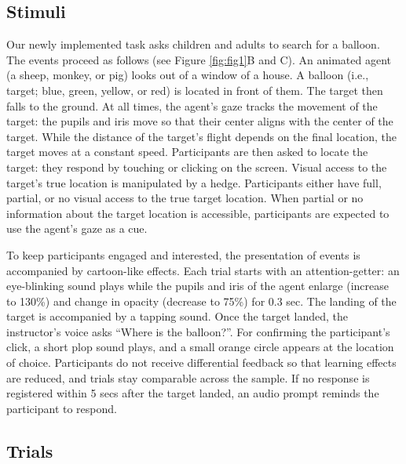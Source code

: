 \documentclass[
  man,floatsintext]{apa6}
\begin{document}
\hypertarget{stimuli}{%
\subsection{Stimuli}\label{stimuli}}

Our newly implemented task asks children and adults to search for a balloon.
The events proceed as follows (see Figure \ref{fig:fig1}B and C).
An animated agent (a sheep, monkey, or pig) looks out of a window of a house.
A balloon (i.e., target; blue, green, yellow, or red) is located in front of them.
The target then falls to the ground.
At all times, the agent's gaze tracks the movement of the target: the pupils and iris move so that their center aligns with the center of the target.
While the distance of the target's flight depends on the final location, the target moves at a constant speed.
Participants are then asked to locate the target: they respond by touching or clicking on the screen.
Visual access to the target's true location is manipulated by a hedge.
Participants either have full, partial, or no visual access to the true target location.
When partial or no information about the target location is accessible, participants are expected to use the agent's gaze as a cue.

To keep participants engaged and interested, the presentation of events is accompanied by cartoon-like effects.
Each trial starts with an attention-getter: an eye-blinking sound plays while the pupils and iris of the agent enlarge (increase to 130\%) and change in opacity (decrease to 75\%) for 0.3 sec.
The landing of the target is accompanied by a tapping sound.
Once the target landed, the instructor's voice asks ``Where is the balloon?''.
For confirming the participant's click, a short plop sound plays, and a small orange circle appears at the location of choice.
Participants do not receive differential feedback so that learning effects are reduced, and trials stay comparable across the sample.
If no response is registered within 5 secs after the target landed, an audio prompt reminds the participant to respond.

\hypertarget{trials}{%
\subsection{Trials}\label{trials}}
\end{document}
